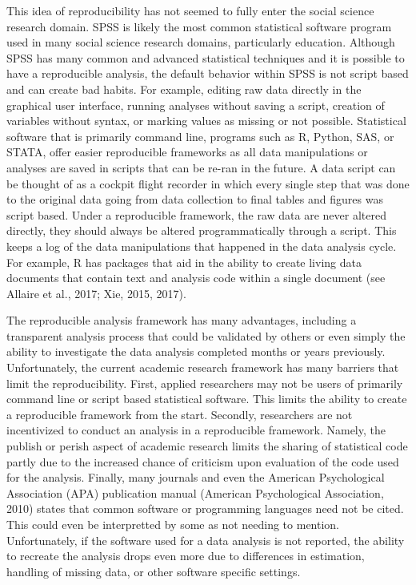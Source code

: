 \documentclass[english,,man]{apa6}
\theoremstyle{definition}
\theoremstyle{definition}
\theoremstyle{definition}
\theoremstyle{remark}
\begin{document}
This idea of reproducibility has not seemed to fully enter the social
science research domain. SPSS is likely the most common statistical
software program used in many social science research domains,
particularly education. Although SPSS has many common and advanced
statistical techniques and it is possible to have a reproducible
analysis, the default behavior within SPSS is not script based and can
create bad habits. For example, editing raw data directly in the
graphical user interface, running analyses without saving a script,
creation of variables without syntax, or marking values as missing or
not possible. Statistical software that is primarily command line,
programs such as R, Python, SAS, or STATA, offer easier reproducible
frameworks as all data manipulations or analyses are saved in scripts
that can be re-ran in the future. A data script can be thought of as a
cockpit flight recorder in which every single step that was done to the
original data going from data collection to final tables and figures was
script based. Under a reproducible framework, the raw data are never
altered directly, they should always be altered programmatically through
a script. This keeps a log of the data manipulations that happened in
the data analysis cycle. For example, R has packages that aid in the
ability to create living data documents that contain text and analysis
code within a single document (see Allaire et al., 2017; Xie, 2015,
2017).

The reproducible analysis framework has many advantages, including a
transparent analysis process that could be validated by others or even
simply the ability to investigate the data analysis completed months or
years previously. Unfortunately, the current academic research framework
has many barriers that limit the reproducibility. First, applied
researchers may not be users of primarily command line or script based
statistical software. This limits the ability to create a reproducible
framework from the start. Secondly, researchers are not incentivized to
conduct an analysis in a reproducible framework. Namely, the publish or
perish aspect of academic research limits the sharing of statistical
code partly due to the increased chance of criticism upon evaluation of
the code used for the analysis. Finally, many journals and even the
American Psychological Association (APA) publication manual (American
Psychological Association, 2010) states that common software or
programming languages need not be cited. This could even be interpretted
by some as not needing to mention. Unfortunately, if the software used
for a data analysis is not reported, the ability to recreate the
analysis drops even more due to differences in estimation, handling of
missing data, or other software specific settings.
\end{document}
